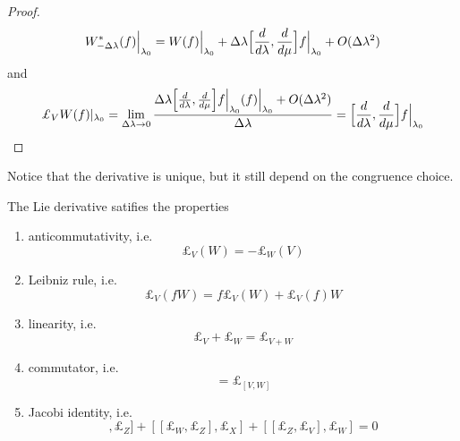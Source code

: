 \begin{proof}
\begin{equation*}
            W^*_{-\Delta\lambda} (f) \Big \vert_{\lambda_0} = W(f) \Big \vert_{\lambda_0} + \Delta \lambda \Big [\frac{d}{d\lambda}, \frac{d}{d\mu} \Big ] f \Big \vert_{\lambda_0} + O(\Delta \lambda^2) 
        \end{equation*}
        and 
        \begin{equation*}
            \pounds_V W(f) \vert_{\lambda_0} = \lim_{\Delta \lambda \rightarrow 0} \frac{\Delta \lambda \Big [\dv{}{\lambda}, \dv{}{\mu} \Big ] f \Big \vert_{\lambda_0} (f) \Big \vert_{\lambda_0} + O(\Delta \lambda^2) }{\Delta \lambda} = \Big [\dv{}{\lambda}, \dv{}{\mu} \Big ] f \Big \vert_{\lambda_0}
        \end{equation*}
    \end{proof}

    Notice that the derivative is unique, but it still depend on the congruence choice. 

    The Lie derivative satifies the properties 
    \begin{enumerate}
        \item anticommutativity, i.e. 
            \begin{equation} \label{anti}
                \pounds_V (W) = - \pounds_W (V) 
            \end{equation}
        \item Leibniz rule, i.e. 
            \begin{equation}\label{leib}
                \pounds_V (fW) = f \pounds_V (W) + \pounds_V (f) W  
            \end{equation}
        \item linearity, i.e.
            \begin{equation*}
                \pounds_V + \pounds_W = \pounds_{V+W}
            \end{equation*}
        \item commutator, i.e.
            \begin{equation*}
                [\pounds_V, \pounds_W] = \pounds_{[V,W]}
            \end{equation*}
        \item Jacobi identity, i.e.
            \begin{equation*}
                [[\pounds_V, \pounds_W], \pounds_Z] + [[\pounds_W, \pounds_Z], \pounds_X] + [[\pounds_Z, \pounds_V], \pounds_W] = 0 
            \end{equation*}
    \end{enumerate}

